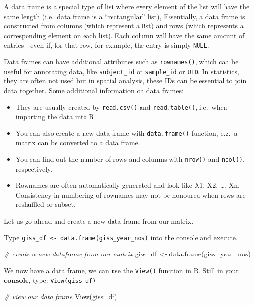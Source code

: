 \documentclass[
]{book}
\newenvironment{Shaded}{\begin{snugshade}}{\end{snugshade}}
\newcommand{\CommentTok}[1]{\textcolor[rgb]{0.56,0.35,0.01}{\textit{#1}}}
\newcommand{\FunctionTok}[1]{\textcolor[rgb]{0.00,0.00,0.00}{#1}}
\newcommand{\NormalTok}[1]{#1}
\newcommand{\OtherTok}[1]{\textcolor[rgb]{0.56,0.35,0.01}{#1}}
\providecommand{\tightlist}{%
  \setlength{\itemsep}{0pt}\setlength{\parskip}{0pt}}
\begin{document}
A data frame is a special type of list where every element of the list will have the same length (i.e.~data frame is a ``rectangular'' list), Essentially, a data frame is constructed from columns (which represent a list) and rows (which represents a corresponding element on each list). Each column will have the same amount of entries - even if, for that row, for example, the entry is simply \texttt{NULL}.

Data frames can have additional attributes such as \texttt{rownames()}, which can be useful for annotating data, like \texttt{subject\_id} or \texttt{sample\_id} or \texttt{UID}. In statistics, they are often not used but in spatial analysis, these IDs can be essential to join data together. Some additional information on data frames:

\begin{itemize}
\tightlist
\item
  They are usually created by \texttt{read.csv()} and \texttt{read.table()}, i.e.~when importing the data into R.
\item
  You can also create a new data frame with \texttt{data.frame()} function, e.g.~a matrix can be converted to a data frame.
\item
  You can find out the number of rows and columns with \texttt{nrow()} and \texttt{ncol()}, respectively.
\item
  Rownames are often automatically generated and look like X1, X2, \ldots, Xn. Consistency in numbering of rownames may not be honoured when rows are reshuffled or subset.
\end{itemize}

Let us go ahead and create a new data frame from our matrix.

Type \texttt{giss\_df\ \textless{}-\ data.frame(giss\_year\_nos)} into the console and execute.

\begin{Shaded}
\begin{Highlighting}[]
\CommentTok{\# create a new dataframe from our matrix}
\NormalTok{giss\_df }\OtherTok{\textless{}{-}} \FunctionTok{data.frame}\NormalTok{(giss\_year\_nos)}
\end{Highlighting}
\end{Shaded}

We now have a data frame, we can use the \texttt{View()} function in R. Still in your \textbf{console}, type: \texttt{View(giss\_df)}

\begin{Shaded}
\begin{Highlighting}[]
\CommentTok{\# view our data frame}
\FunctionTok{View}\NormalTok{(giss\_df)}
\end{Highlighting}
\end{Shaded}
\end{document}
